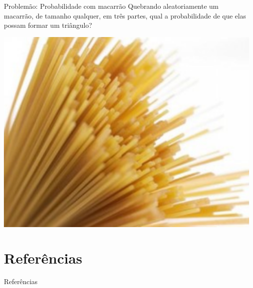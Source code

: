 \documentclass[12pt]{beamer}
\begin{document}
\begin{frame}{Problemão: Probabilidade com macarrão}
    Quebrando aleatoriamente um macarrão, de tamanho qualquer, em três partes, qual a probabilidade de que elas possam formar um triângulo?

    \begin{center}
        \includegraphics[scale=0.3]{imagens/macarrao.png}
    \end{center}
\end{frame}




\section{Referências}

\begin{frame}{Referências}
	

\end{frame}
\end{document}
